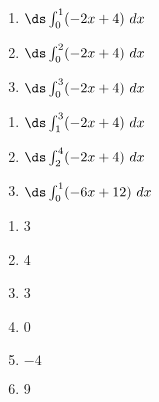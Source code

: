 {\noindent
\begin{minipage}{\linewidth}
\end{minipage}

\noindent\begin{minipage}[t]{.5\linewidth}
\begin{enumerate}
\item		$\ds \int_0^1 (-2x+4)\ dx$
\item		$\ds \int_0^2 (-2x+4)\ dx$
\item		$\ds \int_0^3 (-2x+4)\ dx$
\end{enumerate}
\end{minipage}
\begin{minipage}[t]{.5\linewidth}
\begin{enumerate}\addtocounter{enumii}{3}
\item		$\ds \int_1^3 (-2x+4)\ dx$
\item		$\ds \int_2^4 (-2x+4)\ dx$
\item		$\ds \int_0^1 (-6x+12)\ dx$
\end{enumerate}
\end{minipage}
}
{\begin{enumerate}
\item		3
\item		4
\item		3
\item		0
\item		$-4$
\item		9
\end{enumerate}
}

